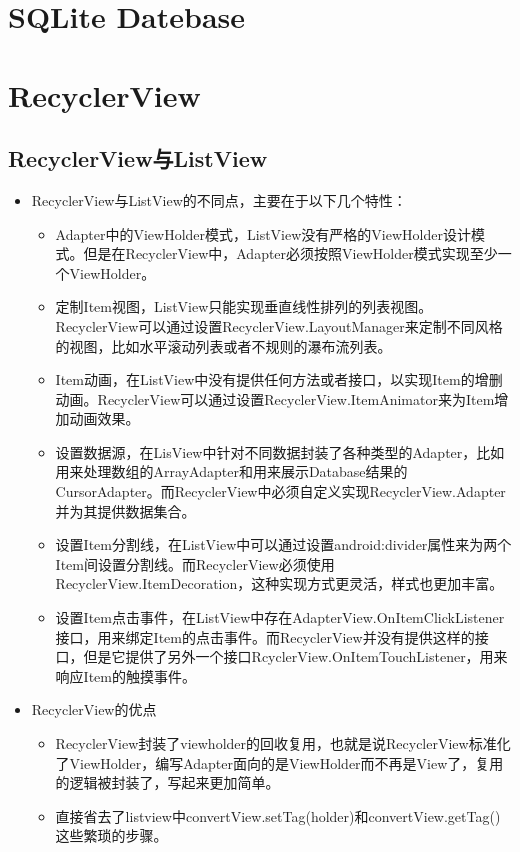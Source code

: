 \documentclass[9pt, b5paper]{article}
\begin{document}
\section{SQLite Datebase}
\label{sec-4}


\section{RecyclerView}
\label{sec-5}
\subsection{RecyclerView与ListView}
\label{sec-5-1}
\begin{itemize}
\item RecyclerView与ListView的不同点，主要在于以下几个特性：
\begin{itemize}
\item Adapter中的ViewHolder模式，ListView没有严格的ViewHolder设计模式。但是在RecyclerView中，Adapter必须按照ViewHolder模式实现至少一个ViewHolder。
\item 定制Item视图，ListView只能实现垂直线性排列的列表视图。RecyclerView可以通过设置RecyclerView.LayoutManager来定制不同风格的视图，比如水平滚动列表或者不规则的瀑布流列表。
\item Item动画，在ListView中没有提供任何方法或者接口，以实现Item的增删动画。RecyclerView可以通过设置RecyclerView.ItemAnimator来为Item增加动画效果。
\item 设置数据源，在LisView中针对不同数据封装了各种类型的Adapter，比如用来处理数组的ArrayAdapter和用来展示Database结果的CursorAdapter。而RecyclerView中必须自定义实现RecyclerView.Adapter并为其提供数据集合。
\item 设置Item分割线，在ListView中可以通过设置android:divider属性来为两个Item间设置分割线。而RecyclerView必须使用RecyclerView.ItemDecoration，这种实现方式更灵活，样式也更加丰富。
\item 设置Item点击事件，在ListView中存在AdapterView.OnItemClickListener接口，用来绑定Item的点击事件。而RecyclerView并没有提供这样的接口，但是它提供了另外一个接口RcyclerView.OnItemTouchListener，用来响应Item的触摸事件。
\end{itemize}
\item RecyclerView的优点
\begin{itemize}
\item RecyclerView封装了viewholder的回收复用，也就是说RecyclerView标准化了ViewHolder，编写Adapter面向的是ViewHolder而不再是View了，复用的逻辑被封装了，写起来更加简单。
\item 直接省去了listview中convertView.setTag(holder)和convertView.getTag()这些繁琐的步骤。

\end{itemize}
\end{itemize}
\end{document}
